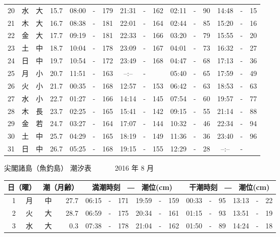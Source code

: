 \documentclass[12pt.a4j]{jsarticle}
\begin{document}
\begin{center}
\begin{table}[ht]
\begin{tabular}{|rc|cr|ccrccr|ccrccr|}
20 & 水 & 大 & 15.7 &  08:00 &-& 179  &  21:31 &-& 162  &   02:11 &-&  90  &   14:48 &-&  15  \\
21 & 木 & 大 & 16.7 &  08:38 &-& 181  &  22:01 &-& 164  &   02:44 &-&  85  &   15:20 &-&  16  \\
22 & 金 & 大 & 17.7 &  09:19 &-& 181  &  22:33 &-& 166  &   03:20 &-&  79  &   15:55 &-&  20  \\
23 & 土 & 中 & 18.7 &  10:04 &-& 178  &  23:09 &-& 167  &   04:01 &-&  73  &   16:32 &-&  27  \\
24 & 日 & 中 & 19.7 &  10:54 &-& 172  &  23:49 &-& 168  &   04:47 &-&  68  &   17:13 &-&  36  \\
25 & 月 & 小 & 20.7 &  11:51 &-& 163  &  --:-- &-&     &   05:40 &-&  65  &   17:59 &-&  49  \\
26 & 火 & 小 & 21.7 &  00:35 &-& 168  &  12:57 &-& 153  &   06:42 &-&  63  &   18:53 &-&  63  \\
27 & 水 & 小 & 22.7 &  01:27 &-& 166  &  14:14 &-& 145  &   07:54 &-&  60  &   19:57 &-&  77  \\
28 & 木 & 長 & 23.7 &  02:25 &-& 165  &  15:41 &-& 142  &   09:15 &-&  55  &   21:14 &-&  88  \\
29 & 金 & 若 & 24.7 &  03:27 &-& 164  &  17:07 &-& 144  &   10:32 &-&  46  &   22:34 &-&  94  \\
30 & 土 & 中 & 25.7 &  04:29 &-& 165  &  18:19 &-& 149  &   11:36 &-&  36  &   23:40 &-&  96  \\
31 & 日 & 中 & 26.7 &  05:25 &-& 168  &  19:15 &-& 155  &   12:29 &-&  28  &   --:-- &-&     \\
   \hline
   \end{tabular}
\end{table}
\newpage
 {\LARGE 尖閣諸島（魚釣島）  潮汐表　　　}
 {\large 2016 年  8 月}\\
 \begin{table}[ht]
    \begin{tabular}{|rc|cr|ccrccr|ccrccr|}
    \hline
    \multicolumn{2}{|c|}{日（曜）} & \multicolumn{2}{c|}{潮（月齢）} & \multicolumn{6}{c|}{満潮時刻　―　潮位(cm)} & \multicolumn{6}{c|}{干潮時刻　―　潮位(cm)} \\
 \hline
 1 & 月 & 中 & 27.7 &  06:15 &-& 171  &  19:59 &-& 159  &   00:33 &-&  95  &   13:13 &-&  22  \\
 2 & 火 & 大 & 28.7 &  06:59 &-& 175  &  20:34 &-& 161  &   01:15 &-&  93  &   13:51 &-&  19  \\
 3 & 水 & 大 &  0.3 &  07:38 &-& 178  &  21:04 &-& 162  &   01:50 &-&  89  &   14:24 &-&  18  \\

\end{tabular}
\end{table}
\end{center}
\end{document}
